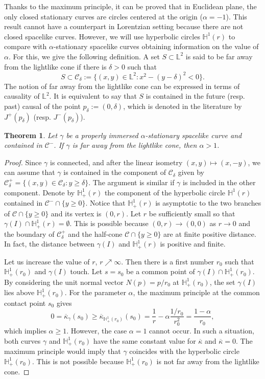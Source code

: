\documentclass[a4paper,12pt]{amsart}
\newtheorem{theorem}{Theorem}[section]
\theoremstyle{definition}
\def\h{\mathbb H}
\def\l{\mathbb L}
\begin{document}
 Thanks to the maximum principle, it can be proved that in Euclidean plane, the only closed stationary curves are  circles centered at the origin ($\alpha=-1$). This result cannot have a counterpart in Lorentzian setting because   there are not closed spacelike curves. However, we will use hyperbolic circles $\h^1(r)$ to compare with $\alpha$-stationary spacelike curves obtaining information on the value of $\alpha$. For this, we give the following definition. A set $S\subset\l^2$ is said to be far away from the lightlike cone if there is $\delta>0$ such that 
  $$S\subset \mathcal{C}_\delta:=\{(x,y)\in\l^2\colon x^2-(y-\delta)^2<0\}.$$
  The notion of far away from the lightlike cone can be expressed in terms of causality of $\l^2$. It is equivalent to say that $S$ is contained in the future (resp. past) causal of the point $p_\delta:=(0,\delta)$, which is denoted in the literature by  $J^+(p_{  \delta})$ (resp. $J^{-}(p_\delta)$).   
    
  \begin{theorem}\label{t24}
   Let $\gamma$ be a properly immersed $\alpha$-stationary spacelike curve and  contained in $\mathcal{C}^-$. If $\gamma$ is far away   from the lightlike cone, then $\alpha>1$.
  \end{theorem}
  \begin{proof}
  Since $\gamma$ is connected, and after the linear isometry $(x,y)\mapsto (x,-y)$, we can assume that $\gamma$ is contained in the component of  $\mathcal{C}_\delta$ given by $\mathcal{C}_\delta^+=\{(x,y)\in \mathcal{C}_\delta\colon y\geq \delta\}$. The argument is similar if $\gamma$ is included in the other component. 
 Denote by $\h^1_+(r)$ the component of the hyperbolic circle $\h^1(r)$   contained in $\mathcal{C}^-\cap\{y\geq 0\}$. Notice that  $\h^1_+(r)$ is asymptotic to the two branches of $\mathcal{C}\cap\{y\geq 0\}$ and its vertex is $(0,r)$. Let $r$ be sufficiently small so that $\gamma(I)\cap\h^1_+(r)=\emptyset$. This is possible because $(0,r)\to (0,0)$ as $r\to 0$ and the boundary of   $ \mathcal{C}_\delta^+$ and the half-cone $\mathcal{C}\cap\{y\geq 0\}$ are at finite positive distance. In fact, the distance between $\gamma(I)$ and $\h^1_+(r)$ is positive and finite. 
 
 
 
Let us increase the value of $r$,  $r\nearrow\infty$. Then there is a first number $r_0$ such that  $\h^1_+(r_0)$ and $\gamma(I)$ touch. Let  $s=s_0$ be a common point of $\gamma(I)\cap \h^1_+(r_0)$. By considering the unit normal vector $N(p)=p/r_0$ at $\h^1_+(r_0)$,   the set $\gamma(I)$ lies above $\h^1_+(r_0)$. For the parameter $\alpha$,  the maximum principle at the common contact point $s_0$ gives
  $$0=\overline{\kappa}_\gamma(s_0)\geq \overline{\kappa}_{\h^1_+(r_0)}(s_0)=\frac{1}{r}-\alpha\frac{1/r_0}{r_0^2}=\frac{1-\alpha}{r_0},$$
which implies $\alpha\geq 1$. However, the case $\alpha=1$ cannot occur. In such a situation, both curves $\gamma$ and  $\h^1_+(r_0)$ have the same constant value for $\overline{\kappa}$ and $\overline{\kappa}=0$. The maximum principle would imply that $\gamma$ coincides with the hyperbolic circle $\h^1_+(r_0)$. This is not possible because $\h^1_+(r_0)$ is not far away from the lightlike cone. 
  \end{proof}
\end{document}
